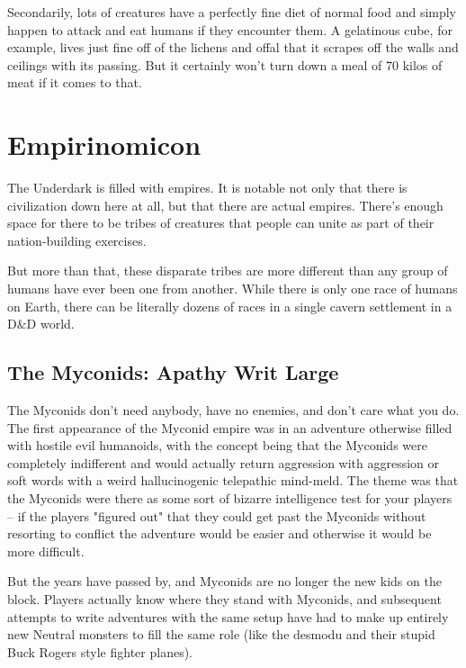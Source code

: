 Secondarily, lots of creatures have a perfectly fine diet of normal food and simply happen to attack and eat humans if they encounter them. A gelatinous cube, for example, lives just fine off of the lichens and offal that it scrapes off the walls and ceilings with its passing. But it certainly won't turn down a meal of 70 kilos of meat if it comes to that.

\section{Empirinomicon}
\vspace*{-10pt}

The Underdark is filled with empires. It is notable not only that there is civilization down here at all, but that there are actual empires. There's enough space for there to be tribes of creatures that people can unite as part of their nation-building exercises.

But more than that, these disparate tribes are more different than any group of humans have ever been one from another. While there is only one race of humans on Earth, there can be literally dozens of races in a single cavern settlement in a D\&D world.

\subsection{The Myconids: Apathy Writ Large}

The Myconids don't need anybody, have no enemies, and don't care what you do. The first appearance of the Myconid empire was in an adventure otherwise filled with hostile evil humanoids, with the concept being that the Myconids were completely indifferent and would actually return aggression with aggression or soft words with a weird hallucinogenic telepathic mind-meld. The theme was that the Myconids were there as some sort of bizarre intelligence test for your players -- if the players "figured out" that they could get past the Myconids without resorting to conflict the adventure would be easier and otherwise it would be more difficult.

But the years have passed by, and Myconids are no longer the new kids on the block. Players actually know where they stand with Myconids, and subsequent attempts to write adventures with the same setup have had to make up entirely new Neutral monsters to fill the same role (like the desmodu and their stupid Buck Rogers style fighter planes).

